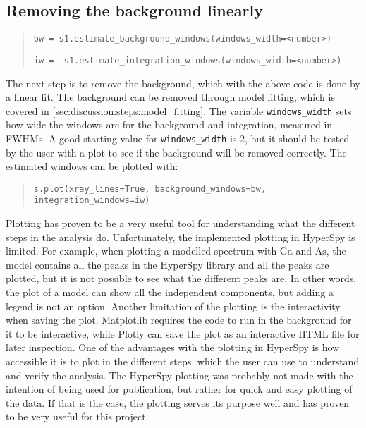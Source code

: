 \subsection{Removing the background linearly}
\label{sec:discussion:steps:background}
\begin{quote}
    \verb|bw = s1.estimate_background_windows(windows_width=<number>)|

    \verb|iw =  s1.estimate_integration_windows(windows_width=<number>)|
\end{quote}

The next step is to remove the background, which with the above code is done by a linear fit.
The background can be removed through model fitting, which is covered in \cref{sec:discussion:steps:model_fitting}.
The variable \verb|windows_width| sets how wide the windows are for the background and integration, measured in FWHMs.
A good starting value for \verb|windows_width| is 2, but it should be tested by the user with a plot to see if the background will be removed correctly.
The estimated windows can be plotted with:

\begin{quote}
    \verb|s.plot(xray_lines=True, background_windows=bw, integration_windows=iw)|
\end{quote}


Plotting has proven to be a very useful tool for understanding what the different steps in the analysis do.
Unfortunately, the implemented plotting in HyperSpy is limited.
For example, when plotting a modelled spectrum with Ga and As, the model contains all the peaks in the HyperSpy library and all the peaks are plotted, but it is not possible to see what the different peaks are.
In other words, the plot of a model can show all the independent components, but adding a legend is not an option.
Another limitation of the plotting is the interactivity when saving the plot.
Matplotlib requires the code to run in the background for it to be interactive, while Plotly can save the plot as an interactive HTML file for later inspection.
One of the advantages with the plotting in HyperSpy is how accessible it is to plot in the different steps, which the user can use to understand and verify the analysis.
The HyperSpy plotting was probably not made with the intention of being used for publication, but rather for quick and easy plotting of the data.
If that is the case, the plotting serves its purpose well and has proven to be very useful for this project.

